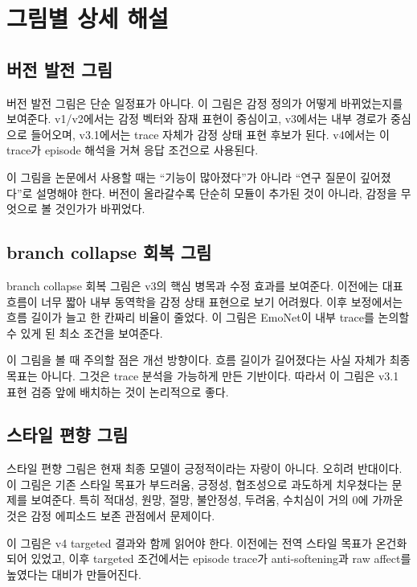 \documentclass[11pt,a4paper]{article}
\begin{document}
\section{그림별 상세 해설}

\subsection{버전 발전 그림}

버전 발전 그림은 단순 일정표가 아니다. 이 그림은 감정 정의가 어떻게 바뀌었는지를 보여준다. v1/v2에서는 감정 벡터와 잠재 표현이 중심이고, v3에서는 내부 경로가 중심으로 들어오며, v3.1에서는 trace 자체가 감정 상태 표현 후보가 된다. v4에서는 이 trace가 episode 해석을 거쳐 응답 조건으로 사용된다.

이 그림을 논문에서 사용할 때는 ``기능이 많아졌다''가 아니라 ``연구 질문이 깊어졌다''로 설명해야 한다. 버전이 올라갈수록 단순히 모듈이 추가된 것이 아니라, 감정을 무엇으로 볼 것인가가 바뀌었다.

\subsection{branch collapse 회복 그림}

branch collapse 회복 그림은 v3의 핵심 병목과 수정 효과를 보여준다. 이전에는 대표 흐름이 너무 짧아 내부 동역학을 감정 상태 표현으로 보기 어려웠다. 이후 보정에서는 흐름 길이가 늘고 한 칸짜리 비율이 줄었다. 이 그림은 EmoNet이 내부 trace를 논의할 수 있게 된 최소 조건을 보여준다.

이 그림을 볼 때 주의할 점은 개선 방향이다. 흐름 길이가 길어졌다는 사실 자체가 최종 목표는 아니다. 그것은 trace 분석을 가능하게 만든 기반이다. 따라서 이 그림은 v3.1 표현 검증 앞에 배치하는 것이 논리적으로 좋다.

\subsection{스타일 편향 그림}

스타일 편향 그림은 현재 최종 모델이 긍정적이라는 자랑이 아니다. 오히려 반대이다. 이 그림은 기존 스타일 목표가 부드러움, 긍정성, 협조성으로 과도하게 치우쳤다는 문제를 보여준다. 특히 적대성, 원망, 절망, 불안정성, 두려움, 수치심이 거의 0에 가까운 것은 감정 에피소드 보존 관점에서 문제이다.

이 그림은 v4 targeted 결과와 함께 읽어야 한다. 이전에는 전역 스타일 목표가 온건화되어 있었고, 이후 targeted 조건에서는 episode trace가 anti-softening과 raw affect를 높였다는 대비가 만들어진다.
\end{document}
